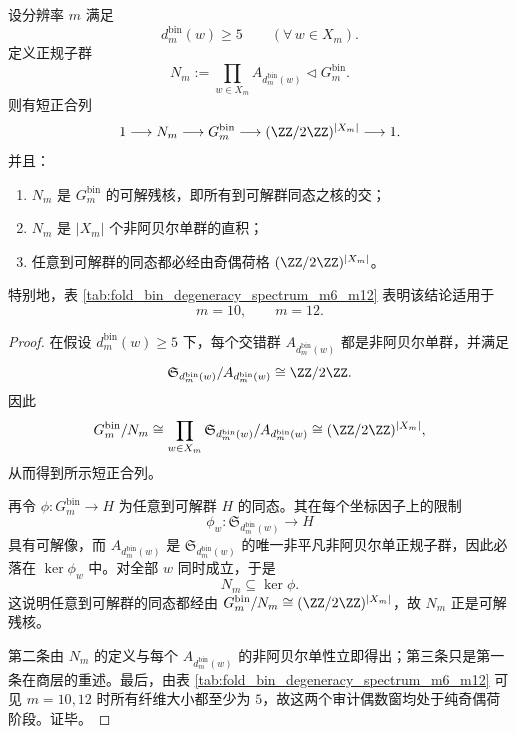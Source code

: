 \begin{theorem}[纯奇偶荷阶段的半单可解残核]\label{thm:xi-foldbin-pure-parity-solvable-residual-kernel}
设分辨率 \(m\) 满足
\[
d_m^{\mathrm{bin}}(w)\ge 5
\qquad (\forall\, w\in X_m).
\]
定义正规子群
\[
N_m:=\prod_{w\in X_m}A_{d_m^{\mathrm{bin}}(w)}
\triangleleft
G_m^{\mathrm{bin}}.
\]
则有短正合列
\[
1\longrightarrow N_m
\longrightarrow G_m^{\mathrm{bin}}
\longrightarrow (\ZZ/2\ZZ)^{|X_m|}
\longrightarrow 1.
\]
并且：
\begin{enumerate}
\item \(N_m\) 是 \(G_m^{\mathrm{bin}}\) 的可解残核，即所有到可解群同态之核的交；
\item \(N_m\) 是 \(|X_m|\) 个非阿贝尔单群的直积；
\item 任意到可解群的同态都必经由奇偶荷格
\(
(\ZZ/2\ZZ)^{|X_m|}
\)。
\end{enumerate}
特别地，表 \ref{tab:fold_bin_degeneracy_spectrum_m6_m12} 表明该结论适用于
\[
m=10,\qquad m=12.
\]
\end{theorem}
\begin{proof}
在假设
\(
d_m^{\mathrm{bin}}(w)\ge 5
\)
下，每个交错群
\(
A_{d_m^{\mathrm{bin}}(w)}
\)
都是非阿贝尔单群，并满足
\[
\mathfrak S_{d_m^{\mathrm{bin}}(w)}/A_{d_m^{\mathrm{bin}}(w)}
\cong
\ZZ/2\ZZ.
\]
因此
\[
G_m^{\mathrm{bin}}/N_m
\cong
\prod_{w\in X_m}
\mathfrak S_{d_m^{\mathrm{bin}}(w)}/A_{d_m^{\mathrm{bin}}(w)}
\cong
(\ZZ/2\ZZ)^{|X_m|},
\]
从而得到所示短正合列。

再令
\(
\phi:G_m^{\mathrm{bin}}\to H
\)
为任意到可解群 \(H\) 的同态。其在每个坐标因子上的限制
\[
\phi_w:\mathfrak S_{d_m^{\mathrm{bin}}(w)}\to H
\]
具有可解像，而
\(
A_{d_m^{\mathrm{bin}}(w)}
\)
是 \(\mathfrak S_{d_m^{\mathrm{bin}}(w)}\) 的唯一非平凡非阿贝尔单正规子群，因此必落在 \(\ker\phi_w\) 中。对全部 \(w\) 同时成立，于是
\[
N_m\subseteq \ker\phi.
\]
这说明任意到可解群的同态都经由
\(
G_m^{\mathrm{bin}}/N_m\cong (\ZZ/2\ZZ)^{|X_m|}
\)，故 \(N_m\) 正是可解残核。

第二条由 \(N_m\) 的定义与每个 \(A_{d_m^{\mathrm{bin}}(w)}\) 的非阿贝尔单性立即得出；第三条只是第一条在商层的重述。最后，由表 \ref{tab:fold_bin_degeneracy_spectrum_m6_m12} 可见 \(m=10,12\) 时所有纤维大小都至少为 \(5\)，故这两个审计偶数窗均处于纯奇偶荷阶段。证毕。
\end{proof}

